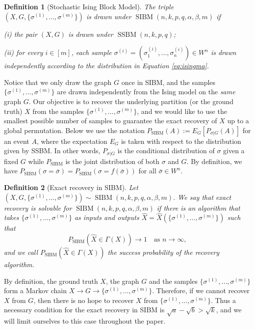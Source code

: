 \documentclass[conference]{IEEEtran}
\newtheorem{definition}{Definition}%
\DeclareMathOperator{\SSBM}{SSBM}
\DeclareMathOperator{\SIBM}{SIBM}
\begin{document}
\begin{definition}[Stochastic Ising Block Model]
The triple $(X,G,\{\sigma^{(1)},\dots,\sigma^{(m)}\})$ is drawn under $\SIBM(n,k, p,q,\alpha,\beta,m)$ if

\noindent
(i) the pair $(X,G)$ is drawn under $\SSBM(n,k, p,q)$;

\noindent
(ii) for every $i\in[m]$, each sample $\sigma^{(i)}=(\sigma_1^{(i)},\dots,\sigma_n^{(i)}) \in W^n$ is drawn independently according to the distribution in Equation \eqref{eq:isingma}.
\end{definition}

Notice that we only draw the graph $G$ once in SIBM, and the samples $\{\sigma^{(1)},\dots,\sigma^{(m)}\}$ are drawn independently from the Ising model on the {\em same} graph $G$.
Our objective is to recover the underlying partition (or the ground truth) $X$ from the samples $\{\sigma^{(1)},\dots,\sigma^{(m)}\}$, and we would like to use the smallest possible number of samples to guarantee the exact recovery of $X$ up to a global permutation.
Below we use the notation $P_{\SIBM}(A):=E_G[P_{\sigma|G}(A)]$ for an event $A$, where the expectation $E_G$ is taken with respect to the distribution given by SSBM. In other words, $P_{\sigma|G}$ is the conditional distribution of  $\sigma$ given a fixed $G$ while $P_{\SIBM}$ is the joint distribution of both $\sigma$ and $G$.
By definition, we have $P_{\SIBM}(\sigma=\bar{\sigma})=P_{\SIBM}(\sigma=f(\bar{\sigma}))$ for all $\bar{\sigma}\in W^n$.


\begin{definition}[Exact recovery in SIBM]
Let $(X,G,\{\sigma^{(1)},\dots,\sigma^{(m)}\}) \sim \SIBM(n,k,p,q,\alpha,\beta,m)$.
We say that exact recovery is solvable for $\SIBM(n,k,p,q,\alpha,\beta,m)$ if there is an algorithm that takes $\{\sigma^{(1)},\dots,\sigma^{(m)}\}$ as inputs and outputs $\hat{X}=\hat{X}(\{\sigma^{(1)},\dots,\sigma^{(m)}\})$ such that
$$
P_{\SIBM}(\hat{X} \in \Gamma(X)) \to 1
\text{~~~as~} n\to\infty ,
$$
and we call $P_{\SIBM}(\hat{X} \in \Gamma(X))$ the success probability of the recovery algorithm.
\end{definition}

By definition, the ground truth $X$, the graph $G$ and the samples $\{\sigma^{(1)},\dots,\sigma^{(m)}\}$ form a Markov chain $X\to G\to \{\sigma^{(1)},\dots,\sigma^{(m)}\}$. Therefore, if we cannot recover $X$ from $G$, then there is no hope to recover $X$ from $\{\sigma^{(1)},\dots,\sigma^{(m)}\}$. Thus a necessary condition for the exact recovery in SIBM is $\sqrt{a}-\sqrt{b}> \sqrt{k}$, and we will limit ourselves to this case throughout the paper.
\end{document}
